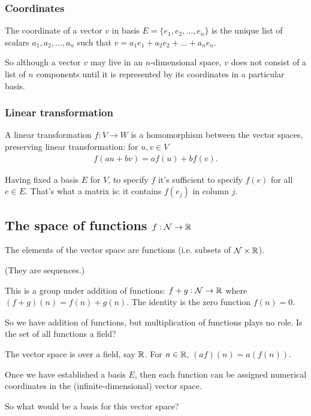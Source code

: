 \subsubsection{Coordinates}
The coordinate of a vector $v$ in basis $E = \{e_1, e_2, \ldots, e_n\}$ is the
unique list of scalars $a_1, a_2, \ldots, a_n$ such that
$v = a_1e_1 + a_2e_2 + \ldots + a_ne_n$.

So although a vector $v$ may live in an $n$-dimensional space, $v$ does not
consist of a list of $n$ components until it is represented by its coordinates
in a particular basis.


\subsubsection{Linear transformation}
A linear transformation $f: V \to W$ is a homomorphism between the vector
spaces, preserving linear transformation: for $u, v \in V$
\begin{align*}
  f(au + bv) = af(u) + bf(v).
\end{align*}

Having fixed a basis $E$ for $V$, to specify $f$ it's sufficient to specify
$f(e)$ for all $e \in E$. That's what a matrix is: it contains $f(e_j)$ in
column $j$.


\subsection{The space of functions $f:\mathcal{N} \to \mathbb{R}$}

The elements of the vector space are functions (i.e. subsets of $\mathcal{N} \times \mathbb{R}$).

(They are sequences.)

This is a group under addition of functions: $f + g: \mathcal{N} \to \mathbb{R}$ where
$(f + g)(n) = f(n) + g(n)$. The identity is the zero function $f(n) = 0$.

So we have addition of functions, but multiplication of functions plays no
role. Is the set of all functions a field?


The vector space is over a field, say $\mathbb{R}$. For $a \in \mathbb{R}$, $(af)(n) = a(f(n))$.

Once we have established a basis $E$, then each function can be assigned
numerical coordinates in the (infinite-dimensional) vector space.

So what would be a basis for this vector space?




\newpage


